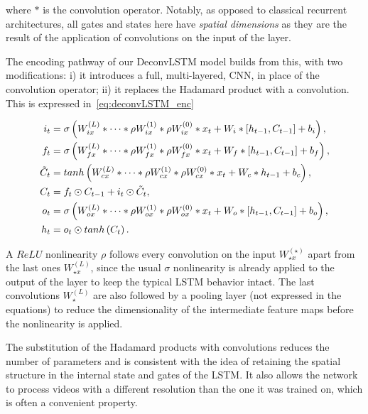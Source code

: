 \noindent where $*$ is the convolution operator. Notably, as opposed to
classical recurrent architectures, all gates and states here have \emph{spatial
dimensions} as they are the result of the application of convolutions on the
input of the layer.

The encoding pathway of our DeconvLSTM model builds from this, with two
modifications: i) it introduces a full, multi-layered, CNN, in place of the
convolution operator; ii) it replaces the Hadamard product with a convolution.
This is expressed in~\autoref{eq:deconvLSTM_enc}

\begin{equation}\label{eq:deconvLSTM_enc}
\begin{split}
    i_t &= \sigma\left(W_{ix}^{(L)} * \dots * \rho W_{ix}^{(1)} *
        \rho W_{ix}^{(0)} * x_t + W_i * \left[h_{t-1}, C_{t-1}\right] +
        b_i \right),\\
    f_t &= \sigma\left(W_{fx}^{(L)} * \dots * \rho W_{fx}^{(1)} *
        \rho W_{fx}^{(0)} * x_t + W_f * \left[h_{t-1}, C_{t-1}\right] +
        b_f \right),\\
    \tilde C_t &= tanh \left(W_{cx}^{(L)} * \dots * \rho W_{cx}^{(1)} *
        \rho W_{cx}^{(0)} * x_t + W_c * h_{t-1} + b_c \right),\\
    C_t &= f_t \odot C_{t-1} + i_t \odot \tilde C_t,\\
    o_t &= \sigma\left(W_{ox}^{(L)} * \dots * \rho W_{ox}^{(1)} *
        \rho W_{ox}^{(0)} * x_t + W_o * \left[h_{t-1}, C_{t-1}\right] +
        b_o \right),\\
    h_t &= o_t \odot tanh \left(C_t\right).
\end{split}
\end{equation}

\noindent A $ReLU$ nonlinearity $\rho$ follows every convolution on the input
$W_{\star x}^{(\star)}$ apart from the last ones $W_{\star x}^{(L)}$, since the
usual $\sigma$ nonlinearity is already applied to the output of the layer to
keep the typical LSTM behavior intact. The last convolutions $W_\star^{(L)}$
are also followed by a pooling layer (not expressed in the equations) to reduce
the dimensionality of the intermediate feature maps before the nonlinearity is
applied.

The substitution of the Hadamard products with convolutions reduces the number
of parameters and is consistent with the idea of retaining the spatial
structure in the internal state and gates of the LSTM. It also allows the
network to process videos with a different resolution than the one it was
trained on, which is often a convenient property.



